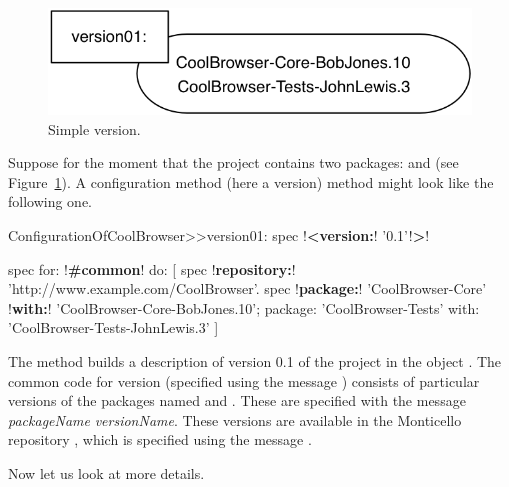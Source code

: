 \documentclass[a4paper,10pt,twoside]{book}
\begin{document}
\begin{figure}
\begin{center}
\includegraphics[width=0.6\linewidth]{version01}
\caption{Simple version.\label{version01}}
\end{center}
\end{figure}

Suppose for the moment that the project  contains two packages:  and  (see Figure~\ref{version01}). A configuration method (here a version) method might look like the following one.

\begin{code}{}
ConfigurationOfCoolBrowser>>version01: spec 
	!\textbf{<version:}! '0.1'!\textbf{>}!
       
	spec for: !\textbf{\#common}! do: [
		spec !\textbf{repository:}! 'http://www.example.com/CoolBrowser'.
		spec 
		    !\textbf{package:}! 'CoolBrowser-Core'  !\textbf{with:}! 'CoolBrowser-Core-BobJones.10';
			package: 'CoolBrowser-Tests' with: 'CoolBrowser-Tests-JohnLewis.3' ]
\end{code}

\noindent
The  method  builds a description of version 0.1 of the project in the object .
The common code for version  (specified using the message ) consists of particular versions of the packages named  and .
These are specified with the message  \emph{packageName}  \emph{versionName}.
These versions are available in the Monticello repository , which is specified using the message .

Now let us look at more details.
\end{document}
